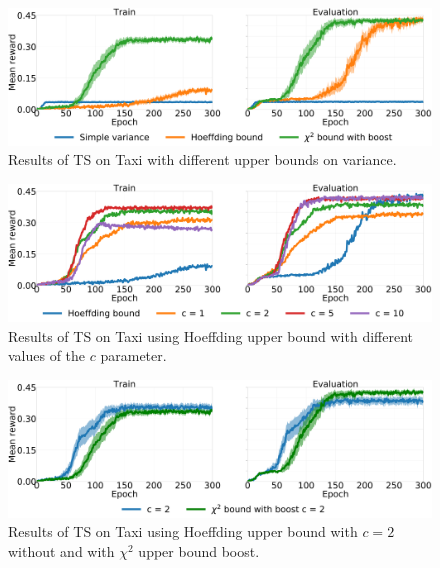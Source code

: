 \begin{figure}[t]
\begin{minipage}{\textwidth}
\begin{center}
  \includegraphics[scale=.05]{img/bounds.pdf}
\end{center}
\end{minipage}
\caption[Taxi with different upper bounds results - 1]{Results of TS on Taxi with different upper bounds on variance.}\label{F:bounds}
\end{figure}
\begin{figure}[t]
\begin{minipage}{\textwidth}
\begin{center}
  \includegraphics[scale=.05]{img/cs.pdf}
\end{center}
\end{minipage}
\caption[Taxi with different upper bounds results - 2]{Results of TS on Taxi using Hoeffding upper bound with different values of the $c$ parameter.}\label{F:cs}
\end{figure}
\begin{figure}[t]
\begin{minipage}{\textwidth}
\begin{center}
  \includegraphics[scale=.05]{img/chics.pdf}
\end{center}
\end{minipage}
\caption[Taxi with different upper bounds results - 3]{Results of TS on Taxi using Hoeffding upper bound with $c=2$ without and with $\chi^2$ upper bound boost.}\label{F:chics}
\end{figure}
